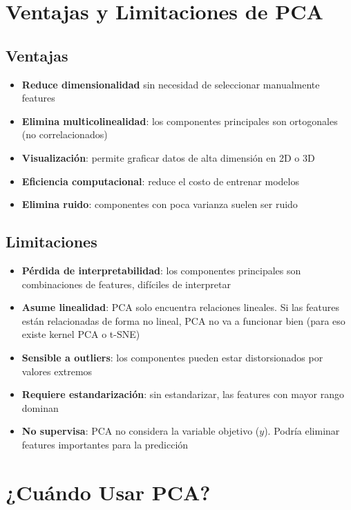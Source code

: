 \documentclass[12pt]{article}
\begin{document}
\section{Ventajas y Limitaciones de PCA}

\subsection{Ventajas}

\begin{itemize}
    \item \textbf{Reduce dimensionalidad} sin necesidad de seleccionar manualmente features
    \item \textbf{Elimina multicolinealidad}: los componentes principales son ortogonales (no correlacionados)
    \item \textbf{Visualización}: permite graficar datos de alta dimensión en 2D o 3D
    \item \textbf{Eficiencia computacional}: reduce el costo de entrenar modelos
    \item \textbf{Elimina ruido}: componentes con poca varianza suelen ser ruido
\end{itemize}

\subsection{Limitaciones}

\begin{itemize}
    \item \textbf{Pérdida de interpretabilidad}: los componentes principales son combinaciones de features, difíciles de interpretar
    \item \textbf{Asume linealidad}: PCA solo encuentra relaciones lineales. Si las features están relacionadas de forma no lineal, PCA no va a funcionar bien (para eso existe kernel PCA o t-SNE)
    \item \textbf{Sensible a outliers}: los componentes pueden estar distorsionados por valores extremos
    \item \textbf{Requiere estandarización}: sin estandarizar, las features con mayor rango dominan
    \item \textbf{No supervisa}: PCA no considera la variable objetivo ($y$). Podría eliminar features importantes para la predicción
\end{itemize}

\section{¿Cuándo Usar PCA?}
\end{document}
